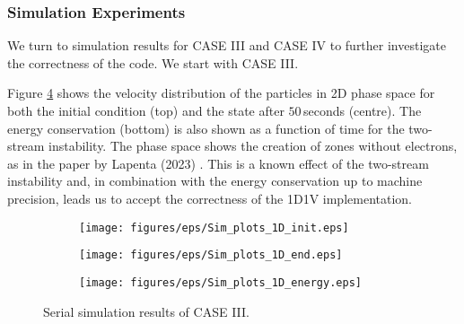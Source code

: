  \subsubsection{Simulation Experiments}
 \label{sub: simulations}
We turn to simulation results for CASE III and CASE IV to further investigate the correctness of the code. We start with CASE III.

 Figure \ref{fig: 1D-1V-sim} shows the velocity distribution of the particles in 2D phase space for both the initial condition (top) and the state after $50$\,seconds (centre). The energy conservation (bottom) is also shown as a function of time for the two-stream instability. The phase space shows the creation of zones without electrons, as in the paper by Lapenta (2023) \cite{lapenta_advances_2023}. This is a known effect of the two-stream instability and, in combination with the energy conservation up to machine precision, leads us to accept the correctness of the 1D1V implementation.
\begin{figure}[h]
\centering
\begin{subfigure}{0.7\linewidth}
  \texttt{[image: figures/eps/Sim\_plots\_1D\_init.eps]}
  \label{fig: ecsim-sim-1d1v-init}  
\end{subfigure}
\vfill
\begin{subfigure}{0.7\linewidth}
  \texttt{[image: figures/eps/Sim\_plots\_1D\_end.eps]}
  \label{fig: ecsim-sim-1d1v-end}
\end{subfigure}
\vfill
\begin{subfigure}{0.7\linewidth}
  \texttt{[image: figures/eps/Sim\_plots\_1D\_energy.eps]}
  \label{fig: ecsim-sim-1d1v-energy}
\end{subfigure}
\caption{Serial simulation results of CASE III.}
\label{fig: 1D-1V-sim}
\end{figure}




